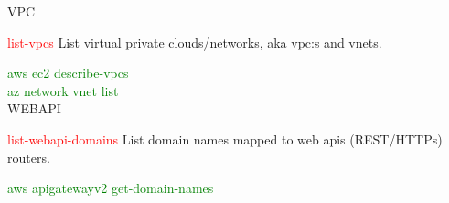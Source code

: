 \documentclass{article}
\newcommand{\cmd}[1]{\textcolor{Red}{#1}}
\newcommand{\help}[1]{#1\par}
\newcommand{\cloud}[1]{\textcolor{Green}{#1}\\}
\begin{document}
{\large VPC}\par
\cmd{list-vpcs} \help{List virtual private clouds/networks, aka vpc:s and vnets.}
\cloud{aws ec2 describe-vpcs}
\cloud{az network vnet list}

{\large WEBAPI}\par
\cmd{list-webapi-domains} \help{List domain names mapped to web apis (REST/HTTPs) routers.}
\cloud{aws apigatewayv2 get-domain-names}
\end{document}
